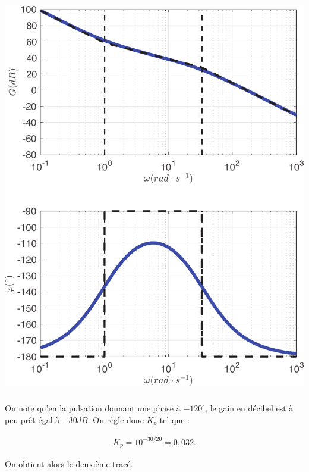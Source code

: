\documentclass[10pt,fleqn]{article} %
\begin{document}
\begin{multicols}{2}
\begin{center}
\includegraphics[width=1.0\linewidth]{images/matlab/bode_total_pi.pdf}
\end{center}

\subparagraph{}\textit{}%

On note qu'en la pulsation donnant une phase à $-120^{\circ}$, le gain en décibel est à peu prêt égal à $-30dB$. On règle donc $K_p$ tel que :

\begin{align*}
\boxed{
K_p=10^{-30/20}=0,032.
}
\end{align*}

On obtient alors le deuxième tracé.


\end{multicols}
\end{document}
